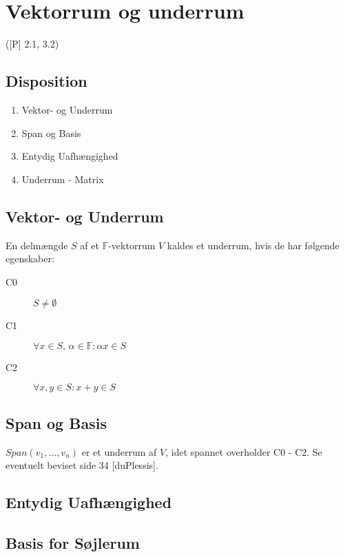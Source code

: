 \newpage
\chapter{Vektorrum og underrum}
([P] 2.1, 3.2)

\section*{Disposition}
\begin{enumerate}
	\item Vektor- og Underrum
	\item Span og Basis
	\item Entydig Uafhængighed
	\item Underrum - Matrix
\end{enumerate}

\section{Vektor- og Underrum}




\hypertarget{def:underrum}{}
En delmængde $S$ af et $\mathbb{F}$-vektorrum $V$ kaldes et underrum, hvis de
har følgende egenskaber:
\begin{description}
	\item[C0] $S \not= \emptyset$
	\item[C1] $\forall x \in S, \, \alpha \in \mathbb{F} \colon \alpha x \in S$
	\item[C2] $\forall x,y \in S \colon x + y \in S$
\end{description}

\section{Span og Basis}


$Span(v_1,\dots,v_n)$ er et underrum af $V$, idet spannet overholder C0 - C2.
Se eventuelt beviset side 34 [duPlessis].



\section{Entydig Uafhængighed}




\section{Basis for Søjlerum}



